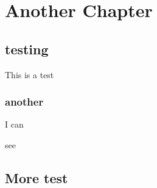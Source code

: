 \chapter{Another Chapter}
\section{testing}
This is a test
\subsection{another}
I can \cite{dijkstra76}

see \cite{dijkstra68}

\section{More test}

